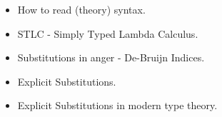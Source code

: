 \begin{itemize}
  \item How to read (theory) syntax.
  \item STLC - Simply Typed Lambda Calculus.
  \item Substitutions in anger - De-Bruijn Indices.
  \item Explicit Substitutions.
  \item Explicit Substitutions in modern type theory.
\end{itemize}
